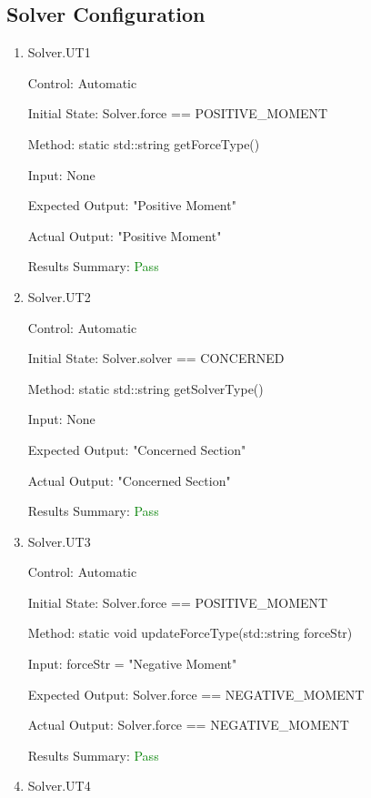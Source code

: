 \documentclass[12pt, titlepage]{article}
\begin{document}
\subsection{Solver Configuration}

\begin{enumerate}

    \item{Solver.UT1\\}
    
    Control: Automatic

    Initial State: Solver.force == POSITIVE\_MOMENT
    
    Method: static std::string getForceType()
    
    Input: None
    
    Expected Output: "Positive Moment"

    Actual Output: "Positive Moment"

    Results Summary: \textcolor{green} {Pass}

    \item{Solver.UT2\\}
    
    Control: Automatic

    Initial State: Solver.solver == CONCERNED
    
    Method: static std::string getSolverType()
    
    Input: None
    
    Expected Output: "Concerned Section"

    Actual Output: "Concerned Section"

    Results Summary: \textcolor{green} {Pass}

    \item{Solver.UT3\\}
    
    Control: Automatic

    Initial State: Solver.force == POSITIVE\_MOMENT
    
    Method: static void updateForceType(std::string forceStr)
    
    Input: forceStr = "Negative Moment"
    
    Expected Output: Solver.force ==  NEGATIVE\_MOMENT

    Actual Output: Solver.force == NEGATIVE\_MOMENT

    Results Summary: \textcolor{green} {Pass}

    \item{Solver.UT4\\}
    

\end{enumerate}
\end{document}
